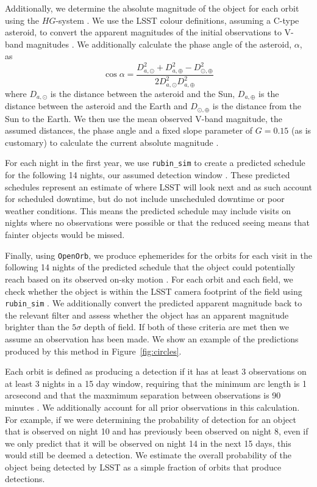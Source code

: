 \documentclass[twocolumn]{aastex631}
\begin{document}
Additionally, we determine the absolute magnitude of the object for each orbit using the $HG$-system \citep{mpc_h_g}. We use the LSST colour definitions, assuming a C-type asteroid, to convert the apparent magnitudes of the initial observations to V-band magnitudes \citep{Jones+2018}. We additionally calculate the phase angle of the asteroid, $\alpha$, as
\begin{equation}
    \cos \alpha = \frac{D_{a, \odot}^2 + D_{a, \oplus}^2 - D_{\odot, \oplus}^2}{2 D_{a, \odot}^2 D_{a, \oplus}^2}
\end{equation}
where $D_{a, \odot}$ is the distance between the asteroid and the Sun, $D_{a, \oplus}$ is the distance between the asteroid and the Earth and $D_{\odot, \oplus}$ is the distance from the Sun to the Earth. We then use the mean observed V-band magnitude, the assumed distances, the phase angle and a fixed slope parameter of $G = 0.15$ (as is customary) to calculate the current absolute magnitude \citep{mpc_h_g}.\

For each night in the first year, we use \texttt{rubin\_sim} to create a predicted schedule for the following 14 nights, our assumed detection window \citep{rubin_sim}. These predicted schedules represent an estimate of where LSST will look next and as such account for scheduled downtime, but do not include unscheduled downtime or poor weather conditions. This means the predicted schedule may include visits on nights where no observations were possible or that the reduced seeing means that fainter objects would be missed.

Finally, using \texttt{OpenOrb}, we produce ephemerides for the orbits for each visit in the following 14 nights of the predicted schedule that the object could potentially reach based on its observed on-sky motion \citep{Granvik+2009}. For each orbit and each field, we check whether the object is within the LSST camera footprint of the field using \texttt{rubin\_sim} \citep{rubin_sim}. We additionally convert the predicted apparent magnitude back to the relevant filter and assess whether the object has an apparent magnitude brighter than the $5\sigma$ depth of field. If both of these criteria are met then we assume an observation has been made. We show an example of the predictions produced by this method in Figure~\ref{fig:circles}.

Each orbit is defined as producing a detection if it has at least 3 observations on at least 3 nights in a 15 day window, requiring that the minimum arc length is 1 arcsecond and that the maxmimum separation between observations is 90 minutes \citep{oss}. We additionally account for all prior observations in this calculation. For example, if we were determining the probability of detection for an object that is observed on night 10 and has previously been observed on night 8, even if we only predict that it will be observed on night 14 in the next 15 days, this would still be deemed a detection. We estimate the overall probability of the object being detected by LSST as a simple fraction of orbits that produce detections.
\end{document}
